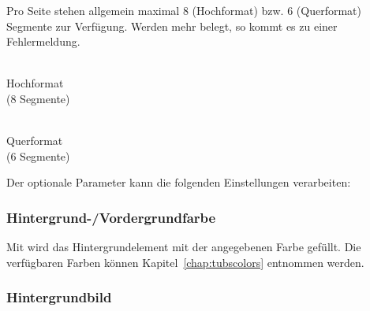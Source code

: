 \noindent\begin{minipage}{0.4\textwidth}
Pro Seite stehen allgemein maximal 8 (Hochformat) bzw. 6 (Querformat)
Segmente zur Verfügung. Werden mehr belegt, so kommt es zu einer Fehlermeldung.
\end{minipage}
\begin{minipage}{0.6\textwidth}\centering
\begin{minipage}[b]{0.4\textwidth}\centering
{}\\
Hochformat\\ (8 Segmente)
\end{minipage}
\begin{minipage}[b]{0.45\textwidth}\centering
{}\\
Querformat\\ (6 Segmente)
\end{minipage}
\end{minipage}
\vspace*{0pt}

Der optionale Parameter  kann die folgenden Einstellungen verarbeiten:

\subsubsection{Hintergrund-/Vordergrundfarbe}

\vspace{-6mm}
\begin{Declaration}
\end{Declaration}

Mit  wird das Hintergrundelement mit der angegebenen
Farbe gefüllt. Die verfügbaren Farben können Kapitel~\ref{chap:tubscolors}
entnommen werden.

\subsubsection{Hintergrundbild}

